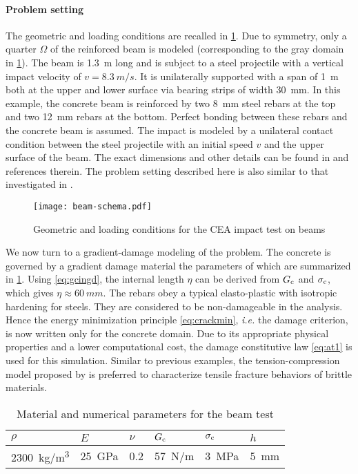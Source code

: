 \paragraph{Problem setting} The geometric and loading conditions are recalled in \cref{fig:beam}. Due to symmetry, only a quarter $\Omega$ of the reinforced beam is modeled (corresponding to the gray domain in \cref{fig:beam}). The beam is \SI{1.3}{m} long and is subject to a steel projectile with a vertical impact velocity of $v=\SI{8.3}{m/s}$. It is unilaterally supported with a span of \SI{1}{m} both at the upper and lower surface via bearing strips of width \SI{30}{mm}. In this example, the concrete beam is reinforced by two \SI{8}{mm} steel rebars at the top and two \SI{12}{mm} rebars at the bottom. Perfect bonding between these rebars and the concrete beam is assumed. The impact is modeled by a unilateral contact condition between the steel projectile with an initial speed $v$ and the upper surface of the beam. The exact dimensions and other details can be found in \cite{Masurel:2015,Guilbaud:2015} and references therein. The problem setting described here is also similar to that investigated in \cite{OzboltSharma:2011,AdhikaryLiFujikake:2012}.
\begin{figure}[htbp]
\centering
\texttt{[image: beam-schema.pdf]}
\caption{Geometric and loading conditions for the CEA impact test on beams} \label{fig:beam}
\end{figure}

We now turn to a gradient-damage modeling of the problem. The concrete is governed by a gradient damage material the parameters of which are summarized in \cref{tab:beamconcrete}. Using \eqref{eq:gcingd}, the internal length $\eta$ can be derived from $G_\mathrm{c}$ and $\sigma_{\mathrm{c}}$, which gives $\eta\approx \SI{60}{mm}$. The rebars obey a typical elasto-plastic with isotropic hardening for steels. They are considered to be non-damageable in the analysis. Hence the energy minimization principle \eqref{eq:crackmin}, \emph{i.e.} the damage criterion, is now written only for the concrete domain. Due to its appropriate physical properties and a lower computational cost, the damage constitutive law \eqref{eq:at1} is used for this simulation. Similar to previous examples, the tension-compression model proposed by \cite{FreddiRoyer-Carfagni:2010} is preferred to characterize tensile fracture behaviors of brittle materials.
\begin{table}[htbp]
\centering
\caption{Material and numerical parameters for the beam test} \label{tab:beamconcrete}
\begin{tabular}{llllll} \toprule
$\rho$ & $E$ & $\nu$ & $G_\mathrm{c}$ & $\sigma_{\mathrm{c}}$ & $h$ \\ \midrule
\SI{2300}{kg/m^3} & \SI{25}{GPa} & 0.2 & \SI{57}{N/m} & \SI{3}{MPa} & \SI{5}{mm} \\ \bottomrule
\end{tabular}
\end{table}

